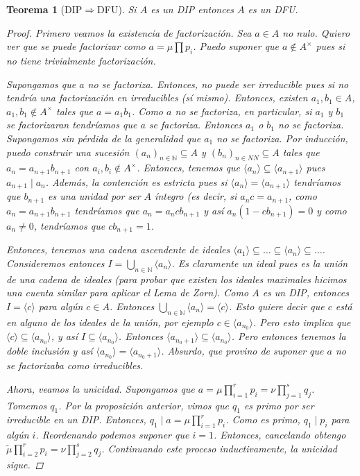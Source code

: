 \documentclass[12pt]{book}
\newtheorem{teo}{Teorema}[section]
\theoremstyle{definition}
\newcommand{\NN}{\mathbb{N}}
\begin{document}
\begin{teo}[DIP$\Longrightarrow$DFU]
Si $A$ es un DIP entonces $A$ es un DFU.
\begin{proof}
Primero veamos la existencia de factorización. Sea $a\in A$ no nulo. Quiero ver que se puede factorizar como $a=\mu \prod p_i$. Puedo suponer que $a\notin A^\times$ pues si no tiene trivialmente factorización.

Supongamos que $a$ no se factoriza. Entonces, no puede ser irreducible pues si no tendría una factorización en irreducibles (sí mismo). Entonces, existen $a_1,b_1\in A$, $a_1,b_1\notin A^\times$ tales que $a=a_1b_1$. Como $a$ no se factoriza, en particular, si $a_1$ y $b_1$ se factorizaran tendríamos que $a$ se factoriza. Entonces $a_1$ o $b_1$ no se factoriza. Supongamos sin pérdida de la generalidad que $a_1$ no se factoriza. Por inducción, puedo construir una sucesión $(a_n)_{n\in \NN}\subseteq A$ y $(b_n)_{n\in NN}\subseteq A$ tales que $a_{n}=a_{n+1}b_{n+1}$ con $a_i,b_i\notin A^\times$. Entonces, tenemos que $\langle a_n\rangle \subseteq \langle a_{n+1}\rangle$ pues $a_{n+1}\mid a_n$. Además, la contención es estricta pues si $\langle a_n\rangle = \langle a_{n+1}\rangle$ tendríamos que $b_{n+1}$ es una unidad por ser $A$ íntegro (es decir, si $a_n c= a_{n+1}$, como $a_n = a_{n+1}b_{n+1}$ tendríamos que $a_n = a_n c b_{n+1}$ y así $a_n(1-cb_{n+1})=0$ y como $a_n\neq 0$, tendríamos que $cb_{n+1}=1$.

Entonces, tenemos una cadena ascendente de ideales $\langle a_1\rangle \subseteq \ldots \subseteq \langle a_n\rangle \subseteq \ldots$. Consideremos entonces $I=\displaystyle\bigcup_{n\in\NN} \langle a_n\rangle$. Es claramente un ideal pues es la unión de una cadena de ideales (para probar que existen los ideales maximales hicimos una cuenta similar para aplicar el Lema de Zorn). Como $A$ es un DIP, entonces $I=\langle c\rangle$ para algún $c\in A$. Entonces $\displaystyle\bigcup_{n\in\NN}\langle a_n\rangle = \langle c\rangle$. Esto quiere decir que $c$ está en alguno de los ideales de la unión, por ejemplo $c\in \langle a_{n_0}\rangle $. Pero esto implica que $\langle c\rangle \subseteq \langle a_{n_0}\rangle$, y así $I\subseteq \langle a_{n_0}\rangle$. Entonces $\langle a_{n_0 +1}\rangle \subseteq \langle a_{n_0}\rangle$. Pero entonces tenemos la doble inclusión y así $\langle a_{n_0}\rangle = \langle a_{n_0+1}\rangle$. Absurdo, que provino de suponer que $a$ no se factorizaba como irreducibles.

Ahora, veamos la unicidad. Supongamos que $a=\mu \prod_{i=1}^r p_i = \nu \prod_{j=1}^s q_j$. Tomemos $q_1$. Por la proposición anterior, vimos que $q_1$ es primo por ser irreducible en un DIP. Entonces, $q_1\mid a = \mu\prod_{i=1}^{r}p_i$. Como es primo, $q_1\mid p_i$ para algún $i$. Reordenando podemos suponer que $i=1$. Entonces, cancelando obtengo $\tilde{\mu}\prod_{i=2}^{r}p_i = \nu \prod_{j=2}^s q_j$. Continuando este proceso inductivamente, la unicidad sigue.

\end{proof}
\end{teo}
\end{document}
